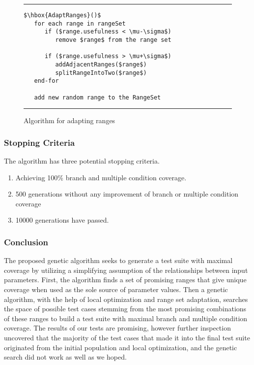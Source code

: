 \documentclass[runningheads]{llncs}
\begin{document}
\begin{figure}[h!]
\begin{center}
\hrule
\medskip
\begin{Verbatim}[fontfamily=tt, xleftmargin=10pt, commandchars=\\\{\},
   codes={\catcode`$=3\catcode`^=7\catcode`_=8}]
$\hbox{AdaptRanges}()$    
   for each range in rangeSet
      if ($range.usefulness < \mu-\sigma$)
         remove $range$ from the range set
      
      if ($range.usefulness > \mu+\sigma$)
         addAdjacentRanges($range$)
         splitRangeIntoTwo($range$)  
   end-for
   
   add new random range to the RangeSet
\end{Verbatim}
\hrule
\end{center}
\caption{Algorithm for adapting ranges \label{fig:adptRang}}
\end{figure}
\FloatBarrier

\subsubsection{Stopping Criteria}
The algorithm has three potential stopping criteria. 
\begin{enumerate}
	\item Achieving 100\% branch and multiple condition coverage. 
	\item 500 generations without any improvement of branch or multiple condition coverage
	\item 10000 generations have passed.
\end{enumerate}

\subsubsection{Conclusion}
The proposed genetic algorithm seeks to generate a test suite with maximal coverage by utilizing a simplifying assumption of the relationships between input parameters. First, the algorithm finds a set of promising ranges that give unique coverage when used as the sole source of parameter values. Then a genetic algorithm, with the help of local optimization and range set adaptation, searches the space of possible test cases stemming from the most promising combinations of these ranges to build a test suite with maximal branch and multiple condition coverage. The results of our tests are promising, however further inspection uncovered that the majority of the test cases that made it into the final test suite originated from the initial population and local optimization, and the genetic search did not work as well as we hoped. 
\end{document}
